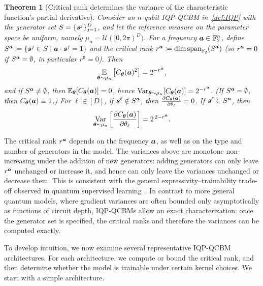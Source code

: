 \documentclass{article}
\theoremstyle{plain}
\newtheorem{theorem}{Theorem}[section]
\theoremstyle{definition}
\theoremstyle{remark}
\begin{document}
\begin{theorem}[Critical rank determines the variance of the characteristic function's partial derivative]
\label{thm:uniform}
Consider an $n$-qubit IQP-QCBM in~\cref{def:IQP} with the generator set $S=\{{\bm{s}^j}\}_{j=1}^D$, and let the reference measure on the parameter space be uniform, namely $\mu_n = \mathcal{U}([0,2\pi)^D)$. For a frequency ${\bm{a}} \in \mathbb{F}_2^n$, define $S^{{\bm{a}}} \coloneqq \{ {\bm{s}^j}\in S \mid {\bm{a}} \cdot {\bm{s}^j} = 1 \}$
and the critical rank $r^{\bm{a}} \coloneqq \dim \operatorname{span}_{\mathbb{F}_2}( S^{{\bm{a}}})$
(so $r^{\bm{a}}=0$ if $S^{\bm{a}}=\emptyset$, in particular $r^{\mathbf 0}=0$). Then
\begin{equation}
\operatorname*{\mathbb{E}}_{{\bm{\theta}}\sim\mu_n}\big[C_{\bm{\theta}}({\bm{a}})^2\big] = 2^{-r^{\bm{a}}},
\end{equation}
and if $S^{\bm{a}}\neq\emptyset$, then $\operatorname*{\mathbb{E}}_{{\bm{\theta}}}[C_{\bm{\theta}}({\bm{a}})]=0$, hence
$\operatorname*{Var}_{{\bm{\theta}}\sim\mu_n}[C_{\bm{\theta}}({\bm{a}})] = 2^{-r^{\bm{a}}}$.
(If $S^{\bm{a}}=\emptyset$, then $C_{\bm{\theta}}({\bm{a}})\equiv 1$.) For $\ell \in [D]$, if ${\bm{s}^\ell} \notin S^{\bm{a}}$, then $ \frac{\partial C_{\bm{\theta}}({\bm{a}})}{\partial \theta_\ell}=0$. If ${\bm{s}^\ell} \in S^{\bm{a}}$, then
\begin{equation}
\operatorname*{Var}_{{\bm{\theta}}\sim\mu_n} \left[ \frac{\partial C_{\bm{\theta}}({\bm{a}})}{\partial \theta_\ell} \right] = 2^{\,2-r^{\bm{a}}}. \end{equation}
\end{theorem}
The critical rank $r^{\bm{a}}$ depends on the frequency ${\bm{a}}$, as well as on the type and number of generators in the model. The variances above are monotone non-increasing under the addition of new generators: adding generators can only leave $r^{\bm{a}}$ unchanged or increase it, and hence can only leave the variances unchanged or decrease them. This is consistent with the general expressivity–trainability trade-off observed in quantum supervised learning~\citet{mcclean18, Holmes22}. In contrast to more general quantum models, where gradient variances are often bounded only asymptotically as functions of circuit depth, IQP-QCBMs allow an exact characterization: once the generator set is specified, the critical ranks and therefore the variances can be computed exactly.

To develop intuition, we now examine several representative IQP-QCBM architectures. For each architecture, we compute or bound the critical rank, and then determine whether the model is trainable under certain kernel choices. We start with a simple architecture.
\end{document}
